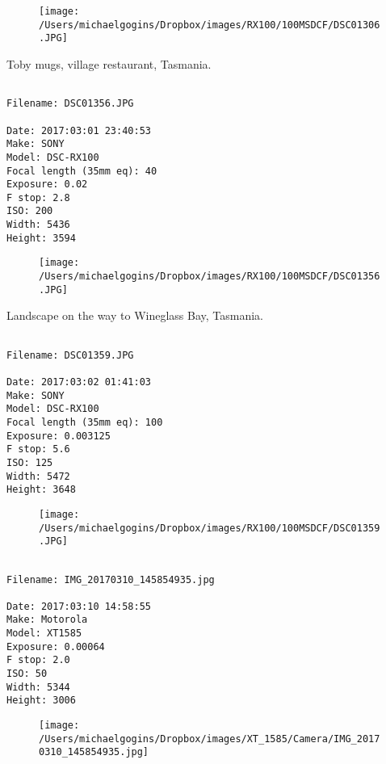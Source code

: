 \begin{figure}
\texttt{[image: /Users/michaelgogins/Dropbox/images/RX100/100MSDCF/DSC01306.JPG]}
\end{figure}
    
\clearpage
\onecolumn
\noindent Toby mugs, village restaurant, Tasmania.
\noindent
\begin{lstlisting}

Filename: DSC01356.JPG

Date: 2017:03:01 23:40:53
Make: SONY
Model: DSC-RX100
Focal length (35mm eq): 40
Exposure: 0.02
F stop: 2.8
ISO: 200
Width: 5436
Height: 3594
\end{lstlisting}
\clearpage

\begin{figure}
\texttt{[image: /Users/michaelgogins/Dropbox/images/RX100/100MSDCF/DSC01356.JPG]}
\end{figure}
    
\clearpage
\onecolumn
\noindent Landscape on the way to Wineglass Bay, Tasmania.
\noindent
\begin{lstlisting}

Filename: DSC01359.JPG

Date: 2017:03:02 01:41:03
Make: SONY
Model: DSC-RX100
Focal length (35mm eq): 100
Exposure: 0.003125
F stop: 5.6
ISO: 125
Width: 5472
Height: 3648
\end{lstlisting}
\clearpage

\begin{figure}
\texttt{[image: /Users/michaelgogins/Dropbox/images/RX100/100MSDCF/DSC01359.JPG]}
\end{figure}
    
\clearpage
\onecolumn
\noindent 
\noindent
\begin{lstlisting}

Filename: IMG_20170310_145854935.jpg

Date: 2017:03:10 14:58:55
Make: Motorola
Model: XT1585
Exposure: 0.00064
F stop: 2.0
ISO: 50
Width: 5344
Height: 3006
\end{lstlisting}
\clearpage

\begin{figure}
\texttt{[image: /Users/michaelgogins/Dropbox/images/XT\_1585/Camera/IMG\_20170310\_145854935.jpg]}
\end{figure}
    
